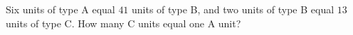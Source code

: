 Six units of type A equal $41$ units of type B, and two units of type B equal $13$ units of type C. How many C units equal one A unit?
